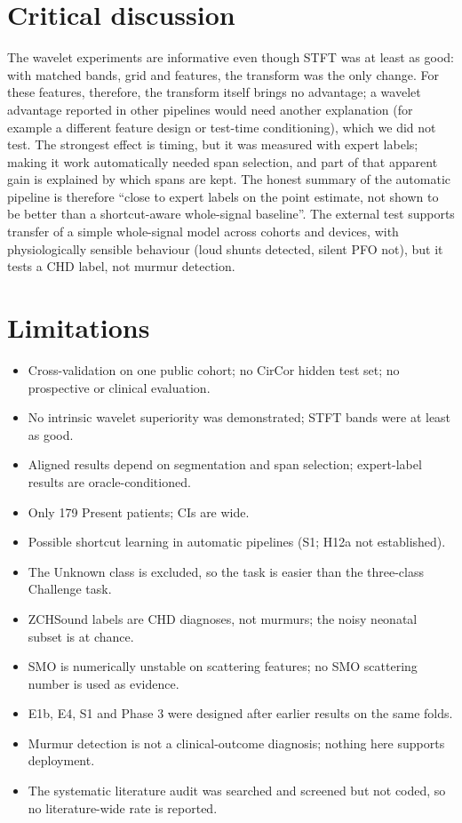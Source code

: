 \documentclass[11pt,a4paper]{article}
\begin{document}
\section{Critical discussion}
The wavelet experiments are informative even though STFT was at least as good: with matched bands, grid and features, the
transform was the only change. For these features, therefore, the transform itself brings no advantage; a wavelet advantage
reported in other pipelines would need another explanation (for example a different feature design or test-time
conditioning), which we did not test. The strongest effect is timing, but it was measured with
expert labels; making it work automatically needed span selection, and part of that apparent gain is explained by which
spans are kept. The honest summary of the automatic pipeline is therefore ``close to expert labels on the point estimate,
not shown to be better than a shortcut-aware whole-signal baseline''. The external test supports transfer of a simple
whole-signal model across cohorts and devices, with physiologically sensible behaviour (loud shunts detected, silent PFO
not), but it tests a CHD label, not murmur detection.

\section{Limitations}
\begin{itemize}\setlength\itemsep{1pt}
\item Cross-validation on one public cohort; no CirCor hidden test set; no prospective or clinical evaluation.
\item No intrinsic wavelet superiority was demonstrated; STFT bands were at least as good.
\item Aligned results depend on segmentation and span selection; expert-label results are oracle-conditioned.
\item Only 179 Present patients; CIs are wide.
\item Possible shortcut learning in automatic pipelines (S1; H12a not established).
\item The Unknown class is excluded, so the task is easier than the three-class Challenge task.
\item ZCHSound labels are CHD diagnoses, not murmurs; the noisy neonatal subset is at chance.
\item SMO is numerically unstable on scattering features; no SMO scattering number is used as evidence.
\item E1b, E4, S1 and Phase 3 were designed after earlier results on the same folds.
\item Murmur detection is not a clinical-outcome diagnosis; nothing here supports deployment.
\item The systematic literature audit was searched and screened but not coded, so no literature-wide rate is reported.
\end{itemize}
\end{document}
